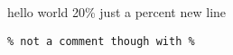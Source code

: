 
hello world
20\% just a percent 
new line \\
\begin{verbatim}
% not a comment though with %
\end{verbatim}
